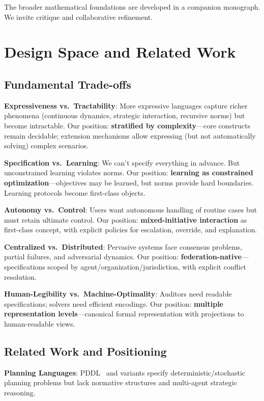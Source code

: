 \documentclass[conference]{IEEEtran}
\begin{document}
The broader mathematical foundations are developed in a companion monograph. We invite critique and collaborative refinement.

\section{Design Space and Related Work}
\label{sec:design-space}

\subsection{Fundamental Trade-offs}

\textbf{Expressiveness vs.\ Tractability}: More expressive languages
capture richer phenomena (continuous dynamics, strategic interaction,
recursive norms) but become intractable. Our position:
\textbf{stratified by complexity}---core constructs remain decidable;
extension mechanisms allow expressing (but not automatically solving)
complex scenarios.

\textbf{Specification vs.\ Learning}: We can't specify everything in
advance. But unconstrained learning violates norms. Our position:
\textbf{learning as constrained optimization}---objectives may be
learned, but norms provide hard boundaries. Learning protocols become
first-class objects.

\textbf{Autonomy vs.\ Control}: Users want autonomous handling of routine
cases but must retain ultimate control. Our position:
\textbf{mixed-initiative interaction} as first-class concept, with
explicit policies for escalation, override, and explanation.

\textbf{Centralized vs.\ Distributed}: Pervasive systems face consensus
problems, partial failures, and adversarial dynamics. Our position:
\textbf{federation-native}---specifications scoped by
agent/organization/jurisdiction, with explicit conflict resolution.

\textbf{Human-Legibility vs.\ Machine-Optimality}: Auditors need readable
specifications; solvers need efficient encodings. Our position:
\textbf{multiple representation levels}---canonical formal
representation with projections to human-readable views.

\subsection{Related Work and Positioning}

\textbf{Planning Languages}: PDDL~\cite{ghallab2004} and variants specify
deterministic/stochastic planning problems but lack normative structures
and multi-agent strategic reasoning.
\end{document}
